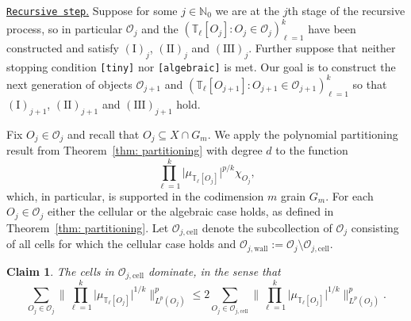 \documentclass[reqno]{amsart}
\numberwithin{equation}{section}
\newcommand{\N}{\mathbb{N}}
\newcommand{\T}{\mathbb{T}}
\newcommand{\cO}{\mathcal{O}}
\theoremstyle{plain}
\newtheorem{claim}[theorem]{Claim}
\theoremstyle{definition}
\newcommand{\cell}{\mathrm{cell}}
\newcommand{\wall}{\mathrm{wall}}
\begin{document}
%
%
%

\noindent\underline{\texttt{Recursive step}.} Suppose for some $j \in \N_0$ we are at the $j$th stage of the recursive process, so in particular $\cO_j$ and the $(\T_{\ell}[O_j] : O_j \in \cO_j)_{\ell = 1}^k$ have been constructed and satisfy $(\mathrm{I})_j$, $(\mathrm{II})_j$ and $(\mathrm{III})_j$. Further suppose that neither stopping condition \texttt{[tiny]} nor \texttt{[algebraic]} is met. Our goal is to construct the next generation of objects $\cO_{j+1}$ and $(\T_{\ell}[O_{j+1}] : O_{j+1} \in \cO_{j+1})_{\ell = 1}^k$ so that $(\mathrm{I})_{j+1}$, $(\mathrm{II})_{j+1}$ and $(\mathrm{III})_{j+1}$ hold.

Fix $O_j \in \cO_j$ and recall that $O_j \subseteq X \cap G_m$. We apply the polynomial partitioning result from Theorem~\ref{thm: partitioning} with degree $d$ to the function
\begin{equation*}
    \prod_{\ell = 1}^k \big| \mu_{\T_{\ell}[O_j]}  \big|^{p/k} \chi_{O_j},
\end{equation*}
which, in particular, is supported in the codimension $m$ grain $G_m$. For each $O_j \in \cO_j$ either the cellular or the algebraic case holds, as defined in Theorem~\ref{thm: partitioning}. Let $\cO_{j,\cell}$ denote the subcollection of $\cO_j$ consisting of all cells for which the cellular case holds and $\cO_{j,\wall} := \cO_j \setminus \cO_{j,\cell}$.\medskip
 
\begin{claim}\label{claim: cell dominate} The cells in $\cO_{j,\cell}$ dominate, in the sense that 
\begin{equation}\label{eq: cell dom}
   \sum_{O_j \in \cO_j} \Big\|\prod_{\ell = 1}^k \big| \mu_{\T_{\ell}[O_j]} \big|^{1/k} \Big\|_{L^p(O_j)}^p \leq 2 \sum_{O_j \in \cO_{j,\cell}} \Big\|\prod_{\ell = 1}^k \big| \mu_{\T_{\ell}[O_j]}  \big|^{1/k} \Big\|_{L^p(O_j)}^p.
\end{equation} 
\end{claim}
\end{document}
